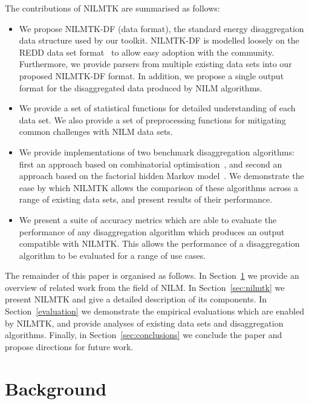 \documentclass{sig-alternate}
\newcommand{\bluecolor}[1]{\textcolor{blue}{#1}}
\newcommand{\secref}[1]{Section~\ref{#1}}
\begin{document}
The contributions of NILMTK are summarised as follows:
\begin{itemize}
\item We propose NILMTK-DF (data format), the standard energy disaggregation data structure used by our toolkit.  NILMTK-DF is modelled loosely on the REDD data set format~\cite{redd} to allow easy adoption with the community. Furthermore, we provide parsers from multiple existing data sets into our proposed NILMTK-DF format. In addition, we propose a single output format for the disaggregated data produced by NILM algorithms.
\item We provide a set of statistical functions for detailed understanding of each data set.  We also provide a set of preprocessing functions for mitigating common challenges with NILM data sets.
\item We provide implementations of two benchmark disaggregation algorithms: first an approach based on combinatorial optimisation~\cite{hart_1992}, and second an approach based on the factorial hidden Markov model~\cite{redd,kim_2011}. We demonstrate the ease by which NILMTK allows the comparison of these algorithms across a range of existing data sets, and present results of their performance.
\item We present a suite of accuracy metrics which are able to evaluate the performance of any disaggregation algorithm which produces an output compatible with NILMTK. This allows the performance of a disaggregation algorithm to be evaluated for a range of use cases.
\end{itemize}

The remainder of this paper is organised as follows. In \secref{sec:related} we provide an overview of related work from the field of NILM. In \secref{sec:nilmtk} we present NILMTK and give a detailed description of its components. In \secref{evaluation} we demonstrate the empirical evaluations which are enabled by NILMTK, and provide analyses of existing data sets and disaggregation algorithms. Finally, in \secref{sec:conclusions} we conclude the paper and propose directions for future work.

\section{Background}
\label{sec:related}
\end{document}
